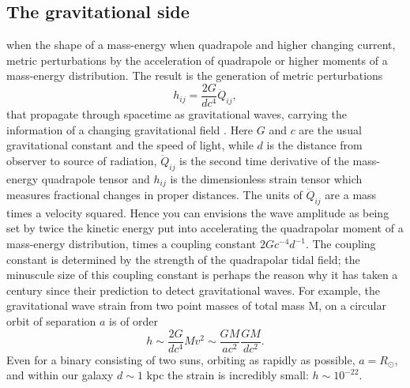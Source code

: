 \subsection{The gravitational side}  %
when the shape of a mass-energy %
when quadrapole and higher %
changing current, metric perturbations %
by the acceleration of quadrapole or higher moments of a mass-energy
distribution. The result is the generation of metric perturbations
\begin{equation}  h_{i j} = \frac{2G}{d c^4}\ddot{Q}_{ij},  \end{equation}
that propagate through spacetime as gravitational waves, carrying the
information of a changing gravitational field
\citep[\emph{e.g.}]{WaldGR:1984}. Here $G$ and $c$ are the usual gravitational
constant and the speed of light, while $d$ is the distance from observer to
source of radiation, $ \ddot{Q}_{ij}$ is the second time derivative of the
mass-energy quadrapole tensor and $h_{ij}$ is the dimensionless strain tensor
which measures fractional changes in proper distances. The units of
$\ddot{Q}_{ij}$ are a mass times a velocity squared. Hence you can envisions
the wave amplitude as being set by twice the kinetic energy put into
accelerating the quadrapolar moment of a mass-energy distribution, times a
coupling constant $2 Gc^{-4}d^{-1}$. The coupling constant is determined by
the strength of the quadrapolar tidal field; the minuscule size of this
coupling constant is perhaps the reason why it has taken a century since their
prediction to detect gravitational waves. For example, the gravitational wave
strain from two point masses of total mass M, on a circular orbit of
separation $a$ is of order \begin{equation}  h \sim \frac{2G}{d c^4} M v^2
\sim \frac{G M }{a c^2} \frac{G M }{d c^2}.  \label{Eq:BinStrain}
\end{equation} Even for a binary consisting of two suns, orbiting as rapidly
as possible, $a=R_{\odot}$, and within our galaxy $d \sim 1$ kpc the strain is
incredibly small: $h\sim10^{-22}$.


